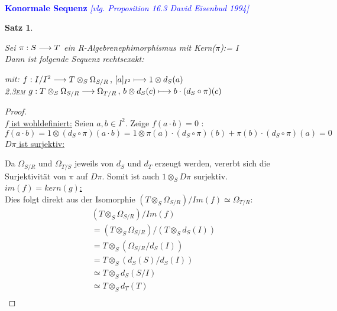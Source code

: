 \documentclass[10pt,a4paper]{report}
\newcommand{\ModulsOfDifferenzials}{David Eisenbud 1994}
\newcounter{Aussage}[chapter]
\newtheorem{satz}[Aussage]{Satz}
\newcommand{\functionfront}[3]{\nolinebreak{#1:#2 \longrightarrow #3}}
\newcommand{\function}[5]{\nolinebreak{#1:#2 \longrightarrow #3 \, , \, #4 \longmapsto #5}}
\newcommand{\divR}[2]{\Omega_{#1/#2}}
\newcommand{\divf}[1]{d_{#1}}
\newcommand{\Tensor}[3]{#1 \otimes_{#2} #3}
\newcommand{\tensor}[3]{#1 \otimes #3}
\newcommand{\kernel}[1]{kern(#1)}
\newcommand{\immage}[1]{im(#1)}
\begin{document}
\ \\
\textcolor{blue}{\textbf{Konormale Sequenz} \textit{[vlg. Proposition 16.3 \ModulsOfDifferenzials]}}
\begin{satz} \label{Konormale Sequenz}
\raggedright
Sei $\functionfront{\pi}{S}{T}$ ein R-Algebrenephimorphismus mit Kern($\pi$):= I \\
Dann ist folgende Sequenz rechtsexakt: \\
\begin{center}
\end{center}
\begin{spacing}{1.5}
mit: $\function{f}{I/I^2}{{\Tensor{T}{S}{\divR{S}{R}}}}{[a]_{I^2}}{\tensor{1}{S}{\divf{S}(a)}}$\\
\textsc{\leftskip2.3em} $\function{g}{\Tensor{T}{S}{\divR{S}{R}}}{\divR{T}{R}}{\tensor{b}{S}{\divf{S}(c)}}{b \cdot (\divf{S} \circ \pi)(c)}$
\end{spacing}
\end{satz}
\begin{proof} \ \\
\underline{$f$ ist wohldefiniert:} Seien $a,b\in I^2$. Zeige $f(a \cdot b)=0$ :
$$ f(a \cdot b) =
\tensor{1}{S}{( \divf{S} \circ \pi )(a \cdot b)} =
\tensor{1}{S}{\pi(a) \cdot (\divf{S} \circ \pi )(b) + \pi(b) \cdot ( \divf{S} \circ \pi )(a)} = 0$$
\underline{$D\pi$ ist surjektiv:}
\begin{center}
\end{center}
Da $\divR{S}{R}$ und $\divR{T}{S}$ jeweils von $\divf{S}$ und $\divf{T}$ erzeugt werden, vererbt sich die Surjektivität von $\pi$ auf $D\pi$. Somit ist auch $\Tensor{1}{S}{D\pi}$ surjektiv.\\
\underline{$\immage{f}=\kernel{g}$:}\\ Dies folgt direkt aus  der Isomorphie $(\Tensor{T}{S}{\divR{S}{R}})/Im(f) \simeq \divR{T}{R}$:
\begin{align*}
(\Tensor{T}{S}{\divR{S}{R}})/Im(f) \\
= (\Tensor{T}{S}{\divR{S}{R}})/(\Tensor{T}{S}{\divf{S}(I)}) \\
= \Tensor{T}{S}{(\divR{S}{R}/\divf{S}(I))} \\ 
= \Tensor{T}{S}{(\divf{S}(S)/ \divf{S}(I))} \\
\simeq \Tensor{T}{S}{\divf{S}(S/I)} \\
\simeq \Tensor{T}{S}{\divf{T}(T)} \\
\end{align*}
\end{proof}
\end{document}
